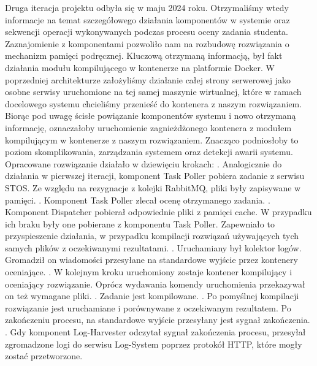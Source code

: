 \newline \indent Druga iteracja projektu odbyła się w maju 2024 roku. Otrzymaliśmy wtedy informacje na temat szczegółowego działania komponentów w systemie oraz sekwencji operacji wykonywanych podczas procesu oceny zadania studenta. Zaznajomienie z komponentami pozwoliło nam na rozbudowę rozwiązania o mechanizm pamięci podręcznej. Kluczową otrzymaną informacją, był fakt działania modułu kompilującego w kontenerze na platformie Docker. W poprzedniej architekturze założyliśmy działanie całej strony serwerowej jako osobne serwisy uruchomione na tej samej maszynie wirtualnej, które w ramach docelowego systemu chcieliśmy przenieść do kontenera z naszym rozwiązaniem. Biorąc pod uwagę ścisłe powiązanie komponentów systemu i nowo otrzymaną informację, oznaczałoby uruchomienie zagnieżdżonego kontenera z modułem kompilującym w kontenerze z naszym rozwiązaniem. Znacząco podniosłoby to poziom skomplikowania, zarządzania systemem oraz detekcji awarii systemu. Opracowane rozwiązanie działało w dziewięciu krokach:
\newline {}. Analogicznie do działania w pierwszej iteracji, komponent Task Poller pobiera zadanie z serwisu STOS. Ze względu na rezygnacje z kolejki RabbitMQ, pliki były zapisywane w pamięci.
\newline {}. Komponent Task Poller zlecał ocenę otrzymanego zadania.
\newline {}. Komponent Dispatcher pobierał odpowiednie pliki z pamięci cache. W przypadku ich braku były one pobierane z komponentu Task Poller. Zapewniało to przyspieszenie działania, w przypadku kompilacji rozwiązań używających tych samych plików z oczekiwanymi rezultatami.
\newline {}. Uruchamiany był kolektor logów. Gromadził on wiadomości przesyłane na standardowe wyjście przez kontenery oceniające.
\newline {}. W kolejnym kroku uruchomiony zostaje kontener kompilujący i oceniający rozwiązanie. Oprócz wydawania komendy uruchomienia przekazywał on też wymagane pliki.
\newline {}. Zadanie jest kompilowane.
\newline {}. Po pomyślnej kompilacji rozwiązanie jest uruchamiane i porównywane z oczekiwanym rezultatem. Po zakończeniu procesu, na standardowe wyjście przesyłany jest sygnał zakończenia.
\newline {}. Gdy komponent Log-Harvester odczytał sygnał zakończenia procesu, przesyłał zgromadzone logi do serwisu Log-System poprzez protokół HTTP, które mogły zostać przetworzone.
